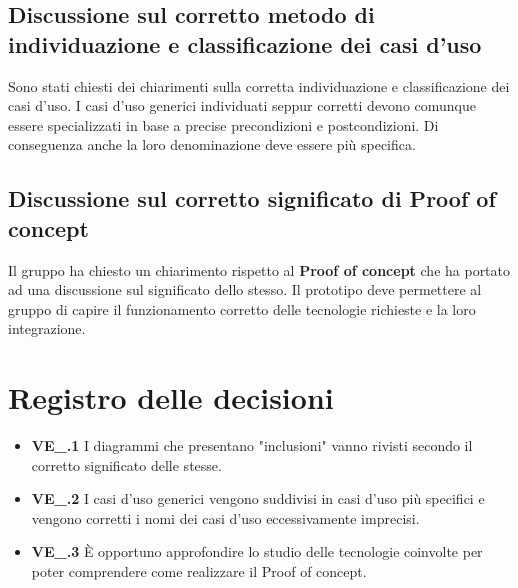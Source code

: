 \subsection{Discussione sul corretto metodo di individuazione e classificazione dei casi d'uso}
Sono stati chiesti dei chiarimenti sulla corretta individuazione e classificazione dei casi d'uso. I casi d'uso generici individuati seppur corretti devono comunque essere specializzati in base a precise precondizioni e postcondizioni. Di conseguenza anche la loro denominazione deve essere più specifica.
\subsection{Discussione sul corretto significato di Proof of concept}
Il gruppo ha chiesto un chiarimento rispetto al \textbf{Proof of concept} che ha portato ad una discussione sul significato dello stesso. Il prototipo deve permettere al gruppo di capire il funzionamento corretto delle tecnologie richieste e la loro integrazione.

\section{Registro delle decisioni}
\begin{itemize}
  \item \textbf{VE\_\Data.1} I diagrammi che presentano "inclusioni" vanno rivisti secondo il corretto significato delle stesse.
   \item \textbf{VE\_\Data.2} I casi d'uso generici vengono suddivisi in casi d'uso più specifici e vengono corretti i nomi dei casi d'uso eccessivamente imprecisi.
   \item \textbf{VE\_\Data.3} È opportuno approfondire lo studio delle tecnologie coinvolte per poter comprendere come realizzare il Proof of concept.
\end{itemize}